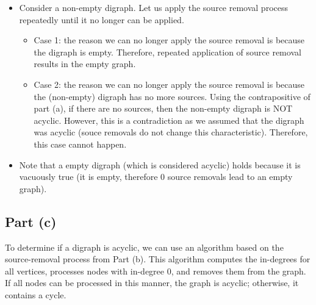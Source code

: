 \documentclass{article}
\begin{document}
\begin{itemize}
    \item Consider a non-empty digraph. Let us apply the source removal process repeatedly until it no longer can be applied.
    \begin{itemize}
        \item Case 1: the reason we can no longer apply the source removal is because the digraph is empty. Therefore, repeated application of source removal results in the empty graph.
        \item Case 2: the reason we can no longer apply the source removal is because the (non-empty) digraph has no more sources. Using the contrapositive of part (a), if there are no sources, then the non-empty digraph is NOT acyclic. However, this is a contradiction as we assumed that the digraph was acyclic (souce removals do not change this characteristic). Therefore, this case cannot happen.
    \end{itemize}
    \item  Note that a empty digraph (which is considered acyclic) holds because it is vacuously true (it is empty, therefore 0 source removals lead to an empty graph).
\end{itemize}


\subsection*{Part (c)}

To determine if a digraph is acyclic, we can use an algorithm based on the source-removal process from Part (b). This algorithm computes the in-degrees for all vertices, processes nodes with in-degree 0, and removes them from the graph. If all nodes can be processed in this manner, the graph is acyclic; otherwise, it contains a cycle. \\
\end{document}
